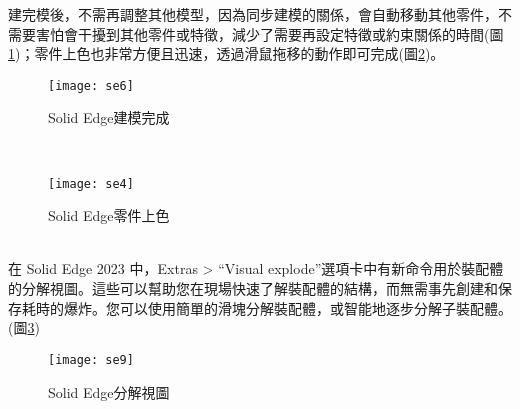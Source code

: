 建完模後，不需再調整其他模型，因為同步建模的關係，會自動移動其他零件，不需要害怕會干擾到其他零件或特徵，減少了需要再設定特徵或約束關係的時間(圖\ref{3.24})；零件上色也非常方便且迅速，透過滑鼠拖移的動作即可完成(圖\ref{3.25})。\\
\begin{figure}[hbt!]
\begin{center}
\texttt{[image: se6]}
\caption{\Large Solid Edge建模完成}\label{3.24}
\end{center}
\end{figure}
\\
\begin{figure}[hbt!]
\begin{center}
\texttt{[image: se4]}
\caption{\Large Solid Edge零件上色}\label{3.25}
\end{center}
\end{figure}
\\

在 Solid Edge 2023 中，Extras > “Visual explode”選項卡中有新命令用於裝配體的分解視圖。這些可以幫助您在現場快速了解裝配體的結構，而無需事先創建和保存耗時的爆炸。您可以使用簡單的滑塊分解裝配體，或智能地逐步分解子裝配體。(圖\ref{3.26})\\
\begin{figure}[hbt!]
\begin{center}
\texttt{[image: se9]}
\caption{\Large Solid Edge分解視圖}\label{3.26}
\end{center}
\end{figure}
\\

\newpage

